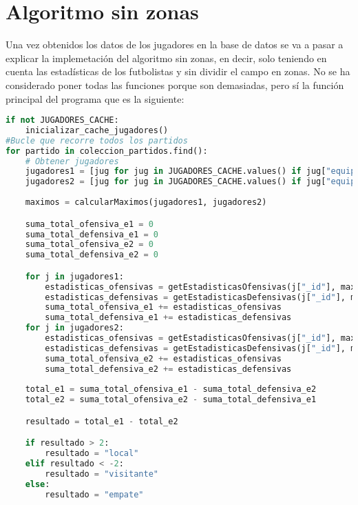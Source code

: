 \section{Algoritmo sin zonas}

Una vez obtenidos los datos de los jugadores en la base de datos se va a pasar a explicar la implemetación del algoritmo sin zonas, en decir, solo teniendo en cuenta las estadísticas de los futbolistas y sin dividir el campo en zonas. No se ha considerado poner todas las funciones porque son demasiadas, pero sí la función principal del programa que es la siguiente:

\begin{lstlisting}[language=Python, caption={Algoritmo sin zonas}, label={lst:codigo-python}]
if not JUGADORES_CACHE:
    inicializar_cache_jugadores()
#Bucle que recorre todos los partidos
for partido in coleccion_partidos.find():
    # Obtener jugadores
    jugadores1 = [jug for jug in JUGADORES_CACHE.values() if jug["equipo"] == partido["Local"] and jug["rival"] == partido["Visitante"] and jug["temporada"] == partido["Temporada"]]
    jugadores2 = [jug for jug in JUGADORES_CACHE.values() if jug["equipo"] == partido["Visitante"] and jug["rival"] == partido["Local"] and jug["temporada"] == partido["Temporada"]]
    
    maximos = calcularMaximos(jugadores1, jugadores2)

    suma_total_ofensiva_e1 = 0
    suma_total_defensiva_e1 = 0
    suma_total_ofensiva_e2 = 0
    suma_total_defensiva_e2 = 0

    for j in jugadores1:
        estadisticas_ofensivas = getEstadisticasOfensivas(j["_id"], maximos)
        estadisticas_defensivas = getEstadisticasDefensivas(j["_id"], maximos)
        suma_total_ofensiva_e1 += estadisticas_ofensivas
        suma_total_defensiva_e1 += estadisticas_defensivas
    for j in jugadores2:
        estadisticas_ofensivas = getEstadisticasOfensivas(j["_id"], maximos)
        estadisticas_defensivas = getEstadisticasDefensivas(j["_id"], maximos)
        suma_total_ofensiva_e2 += estadisticas_ofensivas
        suma_total_defensiva_e2 += estadisticas_defensivas
    
    total_e1 = suma_total_ofensiva_e1 - suma_total_defensiva_e2
    total_e2 = suma_total_ofensiva_e2 - suma_total_defensiva_e1

    resultado = total_e1 - total_e2

    if resultado > 2:
        resultado = "local"
    elif resultado < -2:
        resultado = "visitante"
    else:
        resultado = "empate"
\end{lstlisting}

